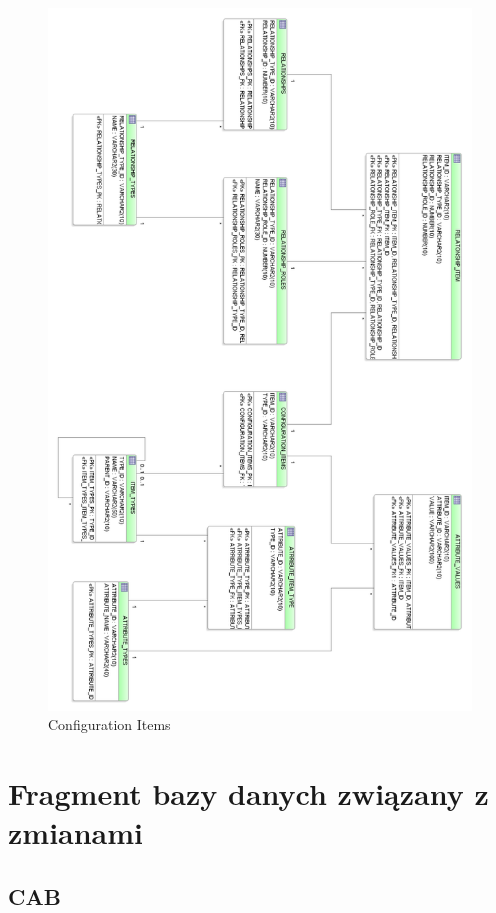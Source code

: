 \documentclass[a4paper, oneside, 11pt]{report}
\begin{document}
\begin{figure}[!ht]
\centering
\includegraphics[width=14cm]{ci.png}
\caption{Configuration Items}
\end{figure}


\section{Fragment bazy danych związany z zmianami}

\subsection{CAB}
\end{document}
